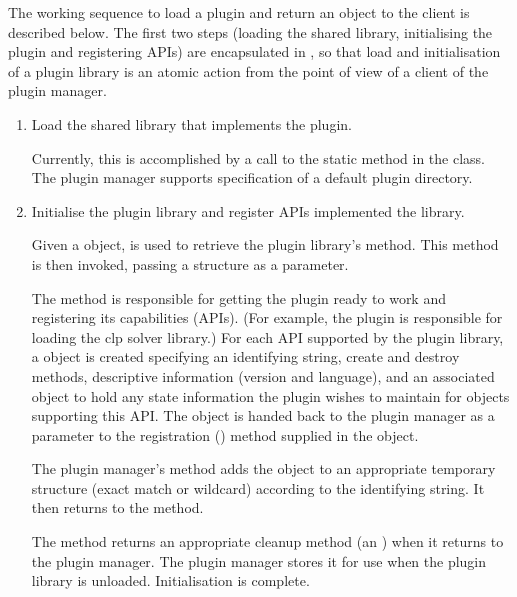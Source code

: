 \documentclass{article}
\begin{document}
The working sequence to load a plugin and return an object to the client is
described below.
The first two steps (loading the shared library, initialising the plugin and
registering APIs) are encapsulated in , so
that load and initialisation of a plugin library is an atomic action from the
point of view of a client of the plugin manager.
\begin{enumerate}
  \item
  Load the shared library that implements the plugin.

  Currently, this is accomplished by a call to the static 
  method in the  class.
  The plugin manager supports specification of a default plugin directory.

  \item
  Initialise the plugin library and register APIs implemented the library.

  Given a  object,  is used to
  retrieve the plugin library's  method.
  This method is then invoked,
  passing a  structure as a parameter.

  The  method is responsible for getting the plugin ready to
  work and registering its capabilities (APIs).
  (For example, the  plugin is responsible for loading the clp
  solver library.)
  For each API supported by the plugin library, a
   object
  is created specifying an identifying string, create and destroy methods,
  descriptive information (version and language), and an associated
  object to hold any state information the plugin wishes to maintain for
  objects supporting this API.
  The  object is handed back to the plugin manager
  as a parameter to the registration () method
  supplied in the  object.

  The plugin manager's  method adds the
   object to an appropriate temporary structure
  (exact match or wildcard) according to the identifying string.
  It then returns to the  method.

  The  method returns an appropriate cleanup method (an
  ) when it returns to the plugin manager.
  The plugin manager stores it for use when the plugin library is unloaded.
  Initialisation is complete.


\end{enumerate}
\end{document}
